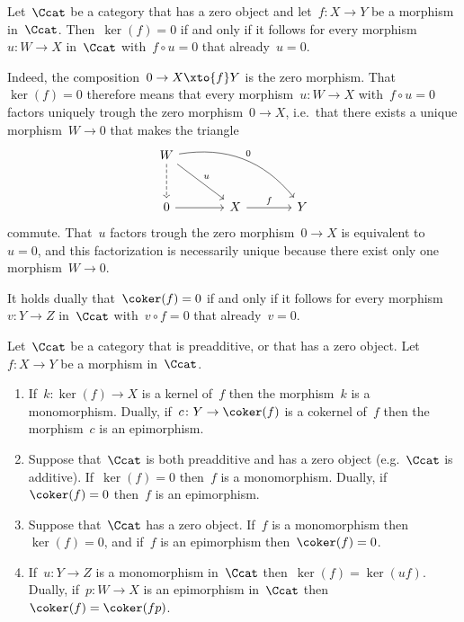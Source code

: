 \begin{remark*}
  Let~$\Ccat$ be a category that has a zero object and let~$f \colon X \to Y$ be a morphism in~$\Ccat$.
  Then~$\ker(f) = 0$ if and only if it follows for every morphism~$u \colon W \to X$ in~$\Ccat$ with~$f \circ u = 0$ that already~$u = 0$.
  
  Indeed, the composition~$0 \to X \xto{f} Y$ is the zero morphism.
  That~$\ker(f) = 0$ therefore means that every morphism~$u \colon W \to X$ with~$f \circ u = 0$ factors uniquely trough the zero morphism~$0 \to X$, i.e.\ that there exists a unique morphism~$W \to 0$ that makes the triangle
  \[
    \begin{tikzcd}[sep = large]
        W
        \arrow[dashed]{d}
        \arrow{dr}[above right]{u}
        \arrow[bend left]{drr}[above right]{0}
      & {}
      & {}
      \\
        0
        \arrow{r}
      & X
        \arrow{r}[above]{f}
      & Y
    \end{tikzcd}
  \]
  commute.
  That~$u$ factors trough the zero morphism~$0 \to X$ is equivalent to~$u = 0$, and this factorization is necessarily unique because there exist only one morphism~$W \to 0$.
  
  It holds dually that~$\coker(f) = 0$ if and only if it follows for every morphism~$v \colon Y \to Z$ in~$\Ccat$ with~$v \circ f = 0$ that already~$v = 0$.
\end{remark*}


\begin{lemma}
  \label{properties of (co)kernels}
  Let~$\Ccat$ be a category that is preadditive, or that has a zero object.
  Let~$f \colon X \to Y$ be a morphism in~$\Ccat$.
  \begin{enumerate}
    \item
      If~$k \colon \ker(f) \to X$ is a kernel of~$f$ then the morphism~$k$ is a monomorphism.
      Dually, if~$c \colon Y \to \coker(f)$ is a cokernel of~$f$ then the morphism~$c$ is an epimorphism.
    \item
      Suppose that~$\Ccat$ is both preadditive and has a zero object (e.g.~$\Ccat$ is additive).
      If~$\ker(f) = 0$ then~$f$ is a monomorphism.
      Dually, if~$\coker(f) = 0$ then~$f$ is an epimorphism.
    \item
      Suppose that~$\Ccat$ has a zero object.
      If~$f$ is a monomorphism then~$\ker(f) = 0$, and if~$f$ is an epimorphism then~$\coker(f) = 0$.
    \item
      \label{(co)kernels under compositions with epis and monos}
      If~$u \colon Y \to Z$ is a monomorphism in~$\Ccat$ then~$\ker(f) = \ker(uf)$.
      Dually, if~$p \colon W \to X$ is an epimorphism in~$\Ccat$ then~$\coker(f) = \coker(fp)$.
  \end{enumerate}
\end{lemma}


